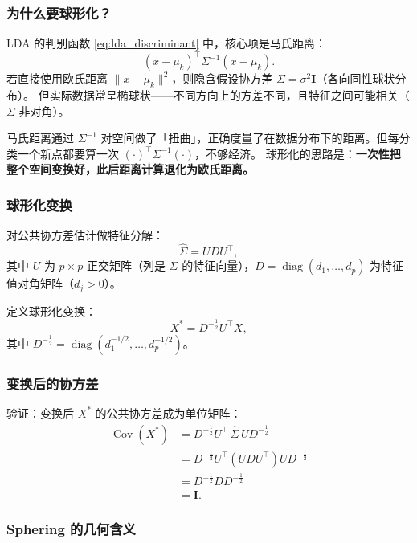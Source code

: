 \subsubsection{为什么要球形化？}

LDA 的判别函数 \eqref{eq:lda_discriminant} 中，核心项是马氏距离：
\[
(x - \mu_k)^\top \Sigma^{-1} (x - \mu_k).
\]
若直接使用欧氏距离 $\|x - \mu_k\|^2$，则隐含假设协方差 $\Sigma = \sigma^2\mathbf{I}$（各向同性球状分布）。
但实际数据常呈椭球状——不同方向上的方差不同，且特征之间可能相关（$\Sigma$ 非对角）。

马氏距离通过 $\Sigma^{-1}$ 对空间做了「扭曲」，正确度量了在数据分布下的距离。但每分类一个新点都要算一次 $(\cdot)^\top \Sigma^{-1}(\cdot)$，不够经济。
球形化的思路是：\textbf{一次性把整个空间变换好，此后距离计算退化为欧氏距离。}

\subsubsection{球形化变换}

对公共协方差估计做特征分解：
\begin{equation}\label{eq:sigma_eigen}
    \hat{\Sigma} = U D U^\top,
\end{equation}
其中 $U$ 为 $p \times p$ 正交矩阵（列是 $\hat{\Sigma}$ 的特征向量），$D = \operatorname{diag}(d_1, \ldots, d_p)$ 为特征值对角矩阵（$d_j > 0$）。

定义球形化变换：
\begin{equation}\label{eq:sphering_transform}
    X^* = D^{-\frac12} U^\top X,
\end{equation}
其中 $D^{-\frac12} = \operatorname{diag}(d_1^{-1/2}, \ldots, d_p^{-1/2})$。

\subsubsection{变换后的协方差}

验证：变换后 $X^*$ 的公共协方差成为单位矩阵：
\[
\begin{aligned}
\operatorname{Cov}(X^*)
&= D^{-\frac12} U^\top \,\hat{\Sigma}\, U D^{-\frac12} \\
&= D^{-\frac12} U^\top (U D U^\top) U D^{-\frac12} \\
&= D^{-\frac12} D D^{-\frac12} \\
&= \mathbf{I}.
\end{aligned}
\]

\subsubsection{Sphering 的几何含义}

